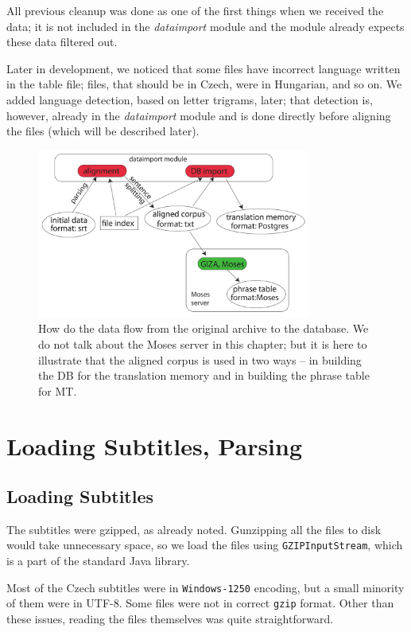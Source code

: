 All previous cleanup was done as one of the first things when we received the data; it is not included in the \emph{dataimport} module and the module already expects these data filtered out.

Later in development, we noticed that some files have incorrect language written in the table file; files, that should be in Czech, were in  Hungarian, and so on. We added language detection, based on letter trigrams, later; that detection is, however, already in the \emph{dataimport} module and is done directly before aligning the files (which will be described later).


\begin{figure}[t]
\begin{center}
\includegraphics[width=0.8\textwidth]{figures/data_flow.pdf}
\end{center}
\caption{How do the data flow from the original archive to the database. We do not talk about the Moses server in this chapter; but it is here to illustrate that the aligned corpus is used in two ways -- in building the DB for the translation memory and in building the phrase table for MT.}\label{dataflow}
\end{figure}

\section{Loading Subtitles, Parsing}
\label{parsing_subs}
\subsection{Loading Subtitles}
The subtitles were gzipped, as already noted. Gunzipping all the files to disk would take unnecessary space, so we load the files using \texttt{GZIPInputStream}, which is a part of the standard Java library.

Most of the Czech subtitles were in \texttt{Windows-1250} encoding, but a small minority of them were in UTF-8. Some files were not in correct \texttt{gzip} format. Other than these issues, reading the files themselves was quite straightforward.

